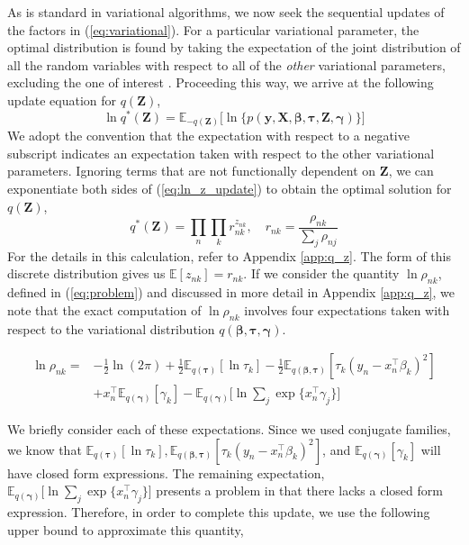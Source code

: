 \documentclass[twoside,11pt]{article}
\newcommand{\tr}{\intercal}
\newcommand{\boldbeta}{\boldsymbol\beta}
\newcommand{\boldgamma}{\boldsymbol\gamma}
\newcommand{\boldtau}{\boldsymbol\tau}
\newcommand{\E}{\mathbb{E}}
\newcommand{\pr}[1]{p \left( #1 \right)}
\begin{document}
As is standard in variational algorithms, we now seek the sequential updates of the factors in (\ref{eq:variational}). For a particular variational parameter, the optimal distribution is found by taking the expectation of the joint distribution of all the random variables with respect to all of the \textit{other} variational parameters, excluding the one of interest \parencite{bishop:06}. Proceeding this way, we arrive at the following update equation for $q(\mathbf{Z})$,
\begin{equation} \label{eq:ln_z_update}
	\ln q^{*}(\mathbf{Z}) = \E_{-q(\mathbf{Z})} \Big[ \ln \big\{ \pr{\mathbf{y}, \mathbf{X}, \boldbeta, \boldtau, \mathbf{Z}, \boldgamma} \big\} \Big]
\end{equation}
We adopt the convention that the expectation with respect to a negative subscript indicates an expectation taken with respect to the other variational parameters. Ignoring terms that are not functionally dependent on $\mathbf{Z}$, we can exponentiate both sides of (\ref{eq:ln_z_update}) to obtain the optimal solution for $q(\mathbf{Z})$,
\begin{equation} \label{optimal_z}
	 q^{*}(\mathbf{Z}) = \prod_{n} \prod_{k} r_{nk}^{z_{nk}}, \quad r_{nk} = \frac{\rho_{nk}}{\sum_{j} \rho_{nj}}
\end{equation}
For the details in this calculation, refer to Appendix \ref{app:q_z}. The form of this discrete distribution gives us $\E[z_{nk}] = r_{nk}$. If we consider the quantity $\ln \rho_{nk}$, defined in (\ref{eq:problem}) and discussed in more detail in Appendix \ref{app:q_z}, we note that the exact computation of $\ln \rho_{nk}$ involves four expectations taken with respect to the variational distribution $q(\boldbeta, \boldtau, \boldgamma)$. 

\begin{equation} \label{eq:problem}
\begin{split}
 \ln \rho_{nk} = &-\frac{1}{2}\ln(2\pi) + \frac{1}{2} \E_{q(\boldsymbol\tau)}[ \ln \tau_k ] - \frac{1}{2} \E_{q(\boldsymbol\beta, \boldsymbol\tau)}[\tau_k (y_n - x_n^{\tr}\beta_k)^2] \\ 
	& + x_n^{\tr}\E_{q(\boldsymbol\gamma)}[\gamma_k] - \E_{q(\boldsymbol\gamma)}\Bigg[\ln  \sum_{j} \exp \{ x_n^{\tr} \gamma_j \}\Bigg]
\end{split}
\end{equation}

We briefly consider each of these expectations. Since we used conjugate families, we know that $\E_{q(\boldsymbol\tau)}[ \ln \tau_k ], \E_{q(\boldsymbol\beta, \boldsymbol\tau)}[\tau_k (y_n - x_n^{\tr}\beta_k)^2]$, and $\E_{q(\boldsymbol\gamma)}[\gamma_k]$ will have closed form expressions. The remaining expectation, 
$\E_{q(\boldsymbol\gamma)}\big[\ln \sum_{j} \exp \{ x_n^{\tr} \gamma_j \} \big]$ presents a problem in that there lacks a closed form expression. Therefore, in order to complete this update, we use the following upper bound to approximate this quantity,
\end{document}
